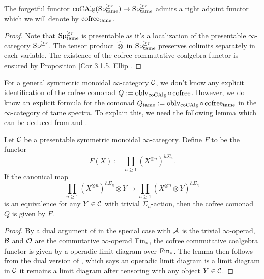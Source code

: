 \begin{corollary}
The forgetful functor $\operatorname{coCAlg}(\operatorname{Sp}_{\operatorname{\operatorname{tame}}}^{\geq r})\to \operatorname{Sp}^{\geq r}_{\operatorname{\operatorname{tame}}}$ admits a right adjoint functor which we will denote by $\operatorname{cofree}_{\operatorname{\operatorname{tame}}}$.
\end{corollary}
\begin{proof}
	 Note that $\operatorname{Sp}^{\geq r}_{\operatorname{\operatorname{tame}}}$ is presentable as it's a localization of the presentable $\infty$-category $\operatorname{Sp}^{\geq r}$. The tensor product $\hat{\otimes}$ in $\operatorname{Sp}_{\operatorname{\operatorname{tame}}}^{\geq r}$ preserves colimits separately in each variable. The existence of the cofree commutative coalgebra functor is ensured by Proposition \ref{Cor 3.1.5. Ellip}.
\end{proof}


For a general symmetric monoidal $\infty$-category ${\mathcal{C}}$, we don't know any explicit identification of the cofree comonad $Q:=\operatorname{oblv}_{\operatorname{coCAlg}}\circ \operatorname{cofree}$. 
However, we do know an explicit formula for the comonad $Q_{\operatorname{\operatorname{tame}}}:=\operatorname{oblv}_{\operatorname{coCAlg}}\circ \operatorname{cofree}_{\operatorname{\operatorname{tame}}}$ in the $\infty$-category of tame spectra. To explain this, we need the following lemma which can be deduced from \cite[Proposition 3.1.3.3]{HA} and \cite[Example 3.1.1.17]{HA}.
\begin{lemma}
\label{Cofree commutative coalgebra}
Let ${\mathcal{C}}$ be a presentable symmetric monoidal $\infty$-category.
Define $F$ to be the functor 
$$
F(X):= \prod_{n\geq 1} (X^{\otimes n})^{h\Sigma_n}.
$$
If the canonical map 
$$
\prod_{n\geq 1} (X^{\otimes n})^{h\Sigma_n} \otimes Y \to 
\prod_{n\geq 1} (X^{\otimes n} \otimes Y)^{h\Sigma_n}
$$
is an equivalence for any $Y\in {\mathcal{C}}$ with trivial $\Sigma_n$-action,
then the cofree comonad $Q$ is given by $F$.
\end{lemma}
\begin{proof}
    By a dual argument of \cite[Proposition 3.1.3.3]{HA} in the special case with ${\mathcal{A}}$ is the trivial $\infty$-operad, ${\mathcal{B}}$ and ${\mathcal{O}}$ are the commutative $\infty$-operad $\operatorname{Fin}_{*}$, the cofree commutative coalgebra functor is given by a operadic limit diagram over $\operatorname{Fin}_{*}$.
    The lemma then follows from the dual version of \cite[Example 3.1.1.17]{HA}, which says an operadic limit diagram is a limit diagram in ${\mathcal{C}}$ it remains a limit diagram after tensoring with any object $Y\in{\mathcal{C}}$.
\end{proof}


